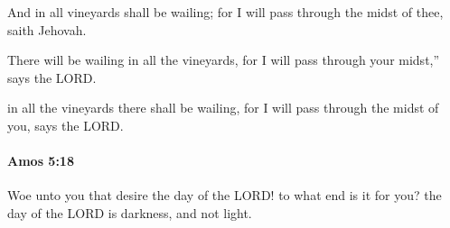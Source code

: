 			\begin{versebox}
					\item[BHS] 
					\item[LXX] 
					\item[ASV] And in all vineyards shall be wailing; for I will pass through the midst of thee, saith Jehovah.
					\item[NIV] There will be wailing in all the vineyards, for I will pass through your midst,” says the LORD.
					\item[NRSV] in all the vineyards there shall be wailing, for I will pass through the midst of you, says the LORD.
			\end{versebox}

		\paragraph{Amos 5:18} %
			\label{AMOS-5-18}

			Woe unto you that desire the day of the LORD! to what end is it for you? the day of the LORD is darkness, and not light.


